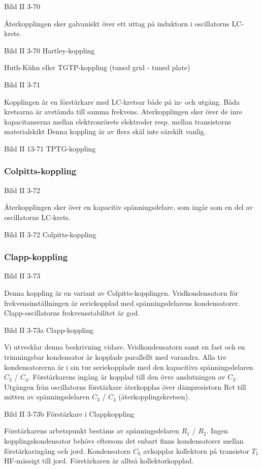 Bild II 3-70

Återkopplingen sker galvaniskt över ett uttag på induktorn i
oscillatorns LC-krets.

Bild II 3-70 Hartley-koppling

Huth-Kühn eller TGTP-koppling (tuned grid - tuned plate)

Bild II 3-71

Kopplingen är en förstärkare med LC-kretsar både på in- och
utgång. Båda kretsarna är avstämda till samma frekvens. Aterkopplingen
sker över de inre kapacitanserna mellan elektronrörets elektroder
resp. mellan transistorns materialskikt Denna koppling är av flera
skäl inte särskilt vanlig.

Bild II 13-71 TPTG-koppling

\subsubsection{Colpitts-koppling}

Bild II 3-72

Återkopplingen sker över en kapacitiv spänningsdelare, som ingår som
en del av oscillatorns LC-krets.

Bild II 3-72 Colpitts-koppling

\subsubsection{Clapp-koppling}

Bild II 3-73

Denna koppling är en variant av Colpitts-kopplingen. Vridkondensatorn
för frekvensinställningen är seriekopplad med spänningsdelarens
kondensatorer. Clapp-oscillatorns frekvensstabilitet är god.

Bild II 3-73a Clapp-koppling

Vi utvecklar denna beskrivning vidare.  Vridkondensatorn samt en fast
och en trimningsbar kondensator är kopplade parallellt med
varandra. Alla tre kondensatorerna är i sin tur seriekopplade med den
kapacitiva spänningsdelaren \(C_3\) / \(C_4\).  Förstärkarens ingång
är kopplad till den övre anslutningen av \(C_3\). Utgången från
oscillatorns förstärkare återkopplas över dämpresistorn Rct till
mitten av spänningsdelaren \(C_3\) / \(C_4\) (återkopplingskretsen).

Bild II 3-73b Förstärkare i Clappkoppling

Förstärkarens arbetspunkt bestäms av spänningsdelaren \(R_1\) /
\(R_2\). Ingen kopplingskondensator behövs eftersom det enbart finns
kondensatorer mellan förstärkaringång och jord.  Kondensatorn \(C_6\)
avkopplar kollektorn på transistor \(T_1\) HF-mässigt till
jord. Förstärkaren är alltså kollektorkopplad.


